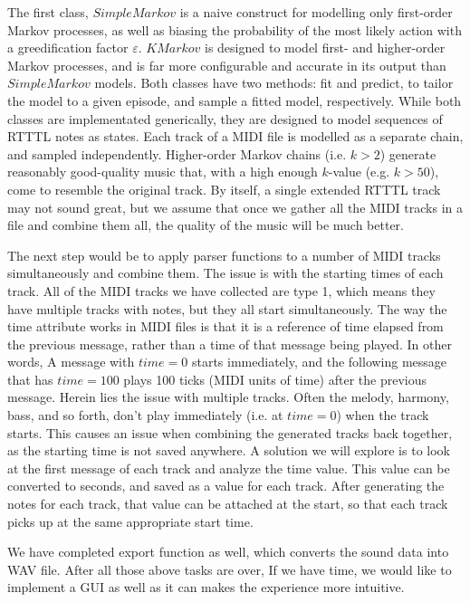 \documentclass{article}
\begin{document}
The first class, $SimpleMarkov$ is a naive construct for modelling only first-order Markov processes, as well as biasing the probability of the most likely action with a 
greedification factor $\varepsilon$. $KMarkov$ is designed to model first- and higher-order Markov processes, and is far more configurable and accurate in its output than 
$SimpleMarkov$ models. Both classes have two methods: fit and predict, to tailor the model to a given episode, and sample a fitted model, respectively. While both classes are 
implementated generically, they are designed to model sequences of RTTTL notes as states. Each track of a MIDI file is modelled as a separate chain, and sampled independently. 
Higher-order Markov chains (i.e. $k>2$) generate reasonably good-quality music that, with a high enough $k$-value (e.g. $k>50$), come to resemble the original track. By itself, 
a single extended RTTTL track may not sound great, but we assume that once we gather all the MIDI tracks in a file and combine them all, the quality of the music will be much 
better. 

The next step would be to apply parser functions to a number of MIDI tracks simultaneously and combine them. The issue is with the starting times of each track. All 
of the MIDI tracks we have collected are type 1, which means they have multiple tracks with notes, but they all start simultaneously. The way the time attribute works in MIDI 
files is that it is a reference of time elapsed from the previous message, rather than a time of that message being played. In other words, A message with $time = 0$ starts 
immediately, and the following message that has $time = 100$ plays 100 ticks (MIDI units of time) after the previous message. Herein lies the issue with multiple tracks. 
Often the melody, harmony, bass, and so forth, don't play immediately (i.e. at $time = 0$) when the track starts. This causes an issue when combining the generated tracks 
back together, as the starting time is not saved anywhere. A solution we will explore is to look at the first message of each track and analyze the time value. This value 
can be converted to seconds, and saved as a value for each track. After generating the notes for each track, that value can be attached at the start, so that each track picks 
up at the same appropriate start time. 

We have completed export function as well, which converts the sound data into WAV file. After all those above tasks are over, If we have time, we would like to implement a 
GUI as well as it can makes the experience more intuitive. 
\end{document}
